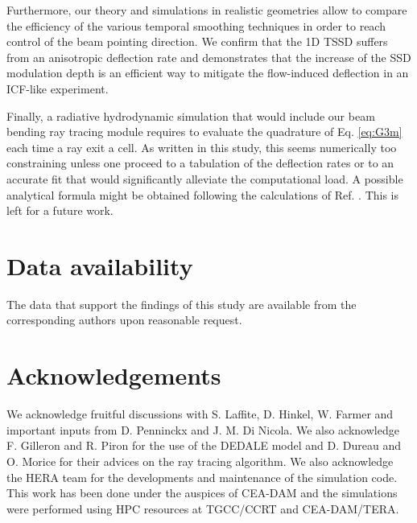 \documentclass[%
 reprint,
 amsmath,amssymb,
 aps,
]{revtex4-1}
\begin{document}
Furthermore, our theory and simulations in realistic geometries allow to compare the efficiency of the various temporal smoothing techniques  in order to reach control of the beam pointing direction. We confirm that the 1D TSSD suffers from an anisotropic deflection rate and demonstrates that the increase of the SSD modulation depth is an efficient way to mitigate the flow-induced deflection in an ICF-like experiment. 

Finally, a radiative hydrodynamic simulation that would include our  beam bending ray tracing module requires to evaluate the quadrature of Eq. \eqref{eq:G3m} each time a ray exit a cell. As written in this study, this seems  numerically too constraining unless one proceed to a tabulation of the deflection rates or to an accurate fit that would significantly alleviate the computational  load. A possible analytical formula might be obtained following the calculations of Ref. \cite[]{POP_Hinkel_1998}. This is left for a future work.

\section*{Data availability}
The data that support the findings of this study are available from the corresponding authors upon reasonable request.

\section*{Acknowledgements}
We acknowledge fruitful discussions with S. Laffite, D. Hinkel,  W. Farmer and important inputs from D. Penninckx and J. M. Di Nicola. We also acknowledge F. Gilleron and R. Piron for the use of the DEDALE model and D. Dureau and O. Morice for their advices on the ray tracing algorithm. We also acknowledge the HERA team for the developments and maintenance of the simulation code.
This work has been done under  the auspices of  CEA-DAM and
the simulations were performed using HPC resources at TGCC/CCRT and CEA-DAM/TERA.
\appendix
\setcounter{equation}{0} 
\renewcommand{\theequation}{A\arabic{equation}}
\end{document}
